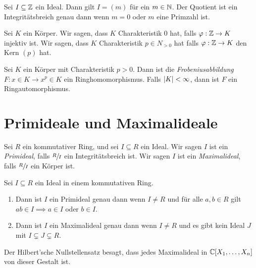 \begin{lemma}
	Sei $I \subseteq \mathbb{Z}$ ein Ideal. Dann gilt $I = (m)$ für ein $m \in \mathbb{N}$. 
	Der Quotient ist ein Integritätsbreich genau dann wenn $m = 0$ oder $m$ eine Primzahl ist.
\end{lemma}


\begin{definition}
	Sei $K$ ein Körper. Wir sagen, dass $K$ Charakteristik $0$ hat, falls $\varphi: \mathbb{Z} \to K$ injektiv ist.
	Wir sagen, dass $K$ Charakteristik $p \in N_{> 0} $ hat falls $\varphi: \mathbb{Z} \to K$ den Kern $(p)$ hat.
\end{definition}


\begin{proposition}
	Sei $K$ ein Körper mit Charakteristik $p > 0$.
	Dann ist die \emph{Frobeniusabbildung} $F: x \in K \to x^{p} \in K$ ein Ringhomomorphismus.
	Falls $\abs{K} < \infty$, dann ist $F$ ein Ringautomorphismus.
\end{proposition}


\section{Primideale und Maximalideale}
\begin{definition}
	Sei $R$ ein kommutativer Ring, und sei $I \subseteq R$ ein Ideal.
	Wir sagen $I$ ist ein \emph{Primideal}, falls $\sfrac{R}{I}$ ein Integritätsbreich ist.
	Wir sagen $I$ ist ein \emph{Maximalideal}, falls $\sfrac{R}{I}$ ein Körper ist.
\end{definition}

\begin{proposition}
	Sei $I \subseteq R$ ein Ideal in einem kommutativen Ring.
	\begin{enumerate}[1)]
		\item Dann ist $I$ ein Primideal genau dann wenn $I \neq R$ und für alle $a,b \in R$ gilt $ab \in I \implies a \in I $ oder $b \in I$.
		\item Dann ist $I$ ein Maximalideal genau dann wenn $I \neq R$ und es gibt kein Ideal $J$ mit $I \subsetneq J \subsetneq R$.
	\end{enumerate}
\end{proposition}




\begin{remark}
	Der Hilbert'sche Nullstellensatz besagt, dass jedes Maximalideal in $\mathbb{C}[X_1,\ldots,X_{n}]$ von dieser Gestalt ist.
\end{remark}

